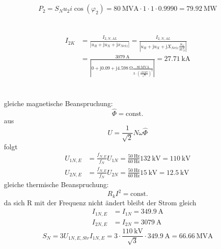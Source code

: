 \documentclass[11pt,a4paper]{scrartcl}
\newcommand{\mybr}[1]{\left(#1\right)}
\renewcommand{\j}{\mathrm{j}}
\newcommand{\0}{_{\mybr{0}}}
\newcommand{\1}{_{\mybr{1}}}
\newcommand{\2}{_{\mybr{2}}}
\newcommand{\ISNA}{I_{2,N,AL}}
\newcommand{\cz}{\cos\mybr{\varphi_2}}
\begin{document}
\subsection{}
\begin{equation}
P_2=S_N u_2 i \cz=\SI{80}{\mega\volt\ampere}\cdot\num{1}\cdot\num{1}\cdot\num{0.9990}=\SI{79.92}{\mega\watt}
\end{equation}

\section{}
\begin{align}
I_{2K}&=\frac{\ISNA}{\left| u_R+\j u_X +\j x_{Netz}\right|}=\frac{\ISNA}{\left| u_R+\j u_X +\j X_{Netz}\frac{S_N}{3U_S^2}\right|}\\
&=\frac{\SI{3079}{\ampere}}{\left| \num{0}+\j\num{0.09}+\j\SI{4.598}{\ohm}\frac{\SI{80}{\mega\volt\ampere}}{3\cdot\mybr{\frac{\SI{132}{\kilo\volt}}{\sqrt{3}}}^2}\right|}=\SI{27.71}{\kilo\ampere}
\end{align}

\section{}
gleiche magnetische Beanspruchung:
\begin{equation}
\hat\Phi=\text{const.}
\end{equation}
aus
\begin{equation}
U=\frac{1}{\sqrt{2}}N\omega\hat\Phi
\end{equation}
folgt
\begin{align}
U_{1N,E}&=\frac{f_{N,E}}{f_{N}}U_{1N}=\frac{\SI{50}{\hertz}}{\SI{60}{\hertz}}\SI{132}{\kilo\volt}=\SI{110}{\kilo\volt}\\
U_{2N,E}&=\frac{f_{N,E}}{f_{N}}U_{2N}=\frac{\SI{50}{\hertz}}{\SI{60}{\hertz}}\SI{15}{\kilo\volt}=\SI{12.5}{\kilo\volt}
\end{align}
gleiche thermische Beanspruchung:
\begin{equation}
R_k I^2 = \text{const.}
\end{equation}
da sich R mit der Frequenz nicht ändert bleibt der Strom gleich
\begin{align}
I_{1N,E}&=I_{1N}=\SI{349.9}{\ampere}\\
I_{2N,E}&=I_{2N}=\SI{3079}{\ampere}
\end{align}
\begin{equation}
S_N=3U_{1N,E,Str}I_{1N,E}=3\cdot\frac{\SI{110}{\kilo\volt}}{\sqrt{3}}\cdot\SI{349.9}{\ampere}=\SI{66.66}{\mega\volt\ampere}
\end{equation}
\end{document}
